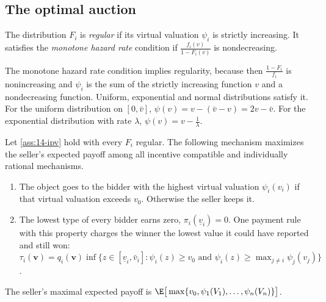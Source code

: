 \subsection{The optimal auction}\label{sec:14-optimal-myerson}

\begin{definition}[Regularity]\label{def:14-regular}
The distribution $F_i$ is \emph{regular} if its virtual valuation $\psi_i$ is strictly increasing. It satisfies the \emph{monotone hazard rate} condition if $\frac{f_i(v)}{1-F_i(v)}$ is nondecreasing.
\end{definition}

The monotone hazard rate condition implies regularity, because then $\frac{1-F_i}{f_i}$ is nonincreasing and $\psi_i$ is the sum of the strictly increasing function $v$ and a nondecreasing function. Uniform, exponential and normal distributions satisfy it. For the uniform distribution on $[0,\bar v]$, $\psi(v)=v-(\bar v-v)=2v-\bar v$. For the exponential distribution with rate $\lambda$, $\psi(v)=v-\frac{1}{\lambda}$.

\begin{proposition}\label{prop:14-myerson}
Let \cref{ass:14-ipv} hold with every $F_i$ regular. The following mechanism maximizes the seller's expected payoff among all incentive compatible and individually rational mechanisms.
\begin{enumerate}[label=(\roman*)]
\item The object goes to the bidder with the highest virtual valuation $\psi_i(v_i)$ if that virtual valuation exceeds $v_0$. Otherwise the seller keeps it.
\item The lowest type of every bidder earns zero, $\pi_i(\underline v_i)=0$. One payment rule with this property charges the winner the lowest value it could have reported and still won: $\tau_i(\bm v)=q_i(\bm v)\inf\{z\in[\underline v_i,\bar v_i]:\psi_i(z)\ge v_0\text{ and }\psi_i(z)\ge\max_{j\neq i}\psi_j(v_j)\}$.
\end{enumerate}
The seller's maximal expected payoff is $\E\big[\max\{v_0,\psi_1(V_1),\dots,\psi_n(V_n)\}\big]$.
\end{proposition}

